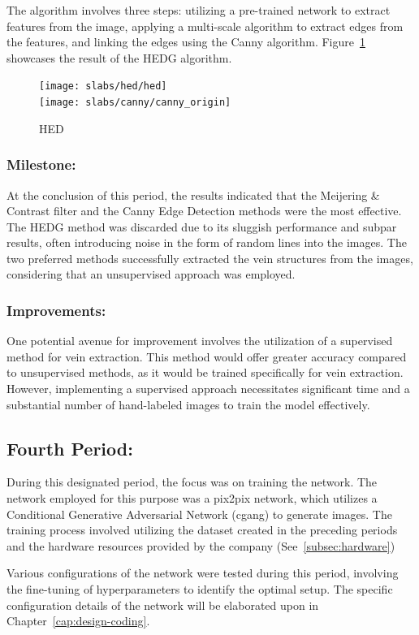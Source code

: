 \begin{itemize}
    The algorithm involves three steps: utilizing a pre-trained network to extract features from the image, applying a multi-scale algorithm to extract edges from the features, and linking the edges using the Canny algorithm. 
    Figure~\ref{fig:hed_compare} showcases the result of the \gls{HEDG} algorithm.
    \begin{figure}[H]
        \centering
        \texttt{[image: slabs/hed/hed]}
        \\
        \texttt{[image: slabs/canny/canny\_origin]}
        \caption{HED}\label{fig:hed_compare}
    \end{figure}
\end{itemize}
\subsubsection{Milestone:}
At the conclusion of this period, the results indicated that the Meijering \& Contrast filter and the Canny Edge Detection methods were the most effective. 
The \gls{HEDG} method was discarded due to its sluggish performance and subpar results, often introducing noise in the form of random lines into the images. 
The two preferred methods successfully extracted the vein structures from the images, considering that an unsupervised approach was employed.
\subsubsection{Improvements:}
One potential avenue for improvement involves the utilization of a supervised method for vein extraction. 
This method would offer greater accuracy compared to unsupervised methods, as it would be trained specifically for vein extraction. 
However, implementing a supervised approach necessitates significant time and a substantial number of hand-labeled images to train the model effectively.

\subsection{Fourth Period:}
During this designated period, the focus was on training the network. 
The network employed for this purpose was a pix2pix network, which utilizes a Conditional Generative Adversarial Network (\gls{cgang}) to generate images. 
The training process involved utilizing the dataset created in the preceding periods and the hardware resources provided by the company (See~\ref{subsec:hardware})

Various configurations of the network were tested during this period, involving the fine-tuning of hyperparameters to identify the optimal setup. 
The specific configuration details of the network will be elaborated upon in Chapter~\ref{cap:design-coding}.
